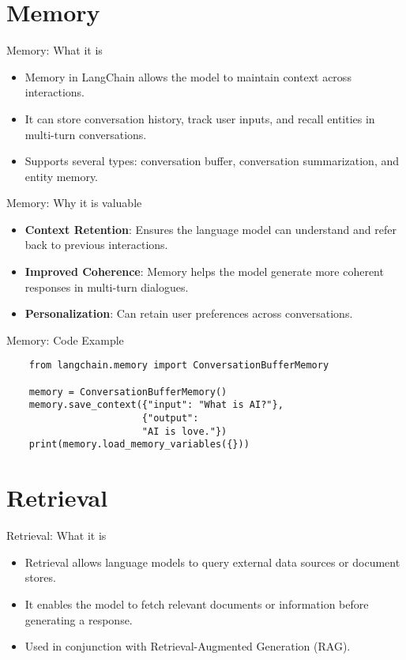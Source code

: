 \documentclass{beamer}
\begin{document}
\section{Memory}

\begin{frame}{Memory: What it is}
    \begin{itemize}
        \item Memory in LangChain allows the model to maintain context across interactions.
        \item It can store conversation history, track user inputs, and recall entities in multi-turn conversations.
        \item Supports several types: conversation buffer, conversation summarization, and entity memory.
    \end{itemize}
\end{frame}

\begin{frame}{Memory: Why it is valuable}
    \begin{itemize}
        \item \textbf{Context Retention}: Ensures the language model can understand and refer back to previous interactions.
        \item \textbf{Improved Coherence}: Memory helps the model generate more coherent responses in multi-turn dialogues.
        \item \textbf{Personalization}: Can retain user preferences across conversations.
    \end{itemize}
\end{frame}

\begin{frame}[fragile]{Memory: Code Example}
    \begin{verbatim}
    from langchain.memory import ConversationBufferMemory

    memory = ConversationBufferMemory()
    memory.save_context({"input": "What is AI?"},
                        {"output":
                        "AI is love."})
    print(memory.load_memory_variables({}))
    \end{verbatim}
\end{frame}

\section{Retrieval}

\begin{frame}{Retrieval: What it is}
    \begin{itemize}
        \item Retrieval allows language models to query external data sources or document stores.
        \item It enables the model to fetch relevant documents or information before generating a response.
        \item Used in conjunction with Retrieval-Augmented Generation (RAG).
    \end{itemize}
\end{frame}
\end{document}
